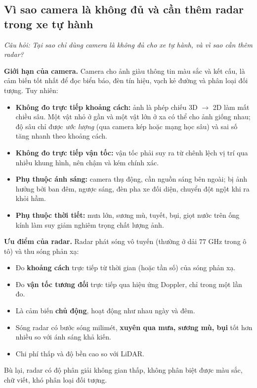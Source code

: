 \subsection{Vì sao camera là không đủ và cần thêm radar trong xe tự hành}
\label{subsec:w2_radar}

\textit{Câu hỏi: Tại sao chỉ dùng camera là không đủ cho xe tự hành, và vì sao cần thêm radar?}

\textbf{Giới hạn của camera.} Camera cho ảnh giàu thông tin màu sắc và kết cấu, là cảm biến tốt nhất để đọc biển báo, đèn tín hiệu, vạch kẻ đường và phân loại đối tượng. Tuy nhiên:
\begin{itemize}
    \item \textbf{Không đo trực tiếp khoảng cách:} ảnh là phép chiếu 3D $\rightarrow$ 2D làm mất chiều sâu. Một vật nhỏ ở gần và một vật lớn ở xa có thể cho ảnh giống nhau; độ sâu chỉ được \emph{ước lượng} (qua camera kép hoặc mạng học sâu) và sai số tăng nhanh theo khoảng cách.
    \item \textbf{Không đo trực tiếp vận tốc:} vận tốc phải suy ra từ chênh lệch vị trí qua nhiều khung hình, nên chậm và kém chính xác.
    \item \textbf{Phụ thuộc ánh sáng:} camera thụ động, cần nguồn sáng bên ngoài; bị ảnh hưởng bởi ban đêm, ngược sáng, đèn pha xe đối diện, chuyển đột ngột khi ra khỏi hầm.
    \item \textbf{Phụ thuộc thời tiết:} mưa lớn, sương mù, tuyết, bụi, giọt nước trên ống kính làm suy giảm nghiêm trọng chất lượng ảnh.
\end{itemize}

\textbf{Ưu điểm của radar.} Radar phát sóng vô tuyến (thường ở dải $77$ GHz trong ô tô) và thu sóng phản xạ:
\begin{itemize}
    \item Đo \textbf{khoảng cách} trực tiếp từ thời gian (hoặc tần số) của sóng phản xạ.
    \item Đo \textbf{vận tốc tương đối} trực tiếp qua hiệu ứng Doppler, chỉ trong một lần đo.
    \item Là cảm biến \textbf{chủ động}, hoạt động như nhau ngày và đêm.
    \item Sóng radar có bước sóng milimét, \textbf{xuyên qua mưa, sương mù, bụi} tốt hơn nhiều so với ánh sáng khả kiến.
    \item Chi phí thấp và độ bền cao so với LiDAR.
\end{itemize}
Bù lại, radar có độ phân giải không gian thấp, không phân biệt được màu sắc, chữ viết, khó phân loại đối tượng.

